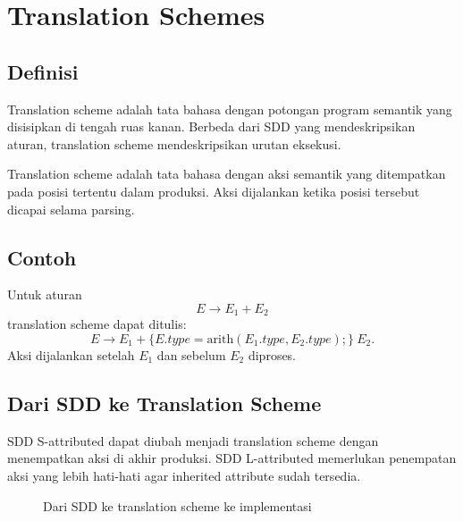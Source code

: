 \section{Translation Schemes}
\label{sec:ch14-scheme}

\subsection{Definisi}

Translation scheme adalah tata bahasa dengan potongan program
semantik yang disisipkan di tengah ruas kanan. Berbeda dari SDD yang
mendeskripsikan aturan, translation scheme mendeskripsikan urutan
eksekusi.

\begin{definisi}
Translation scheme adalah tata bahasa dengan aksi semantik yang
ditempatkan pada posisi tertentu dalam produksi. Aksi dijalankan
ketika posisi tersebut dicapai selama parsing.
\end{definisi}

\subsection{Contoh}

Untuk aturan
\[
E \to E_1 + E_2
\]
translation scheme dapat ditulis:
\[
E \to E_1 + \{ E.type = \text{arith}(E_1.type, E_2.type); \}\ E_2.
\]
Aksi dijalankan setelah \(E_1\) dan sebelum \(E_2\) diproses.

\subsection{Dari SDD ke Translation Scheme}

SDD S-attributed dapat diubah menjadi translation scheme dengan
menempatkan aksi di akhir produksi. SDD L-attributed memerlukan
penempatan aksi yang lebih hati-hati agar inherited attribute sudah
tersedia.

\begin{figure}[H]
\centering
{}
\caption{Dari SDD ke translation scheme ke implementasi}
\label{fig:ch14-scheme}
\end{figure}

